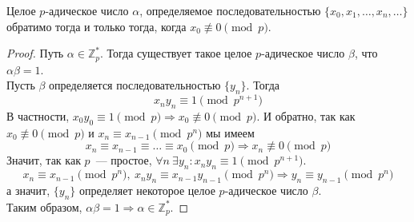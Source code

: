 \documentclass[11pt]{article}
\begin{document}
    \begin{theorem} \label{UnitP-adic}
        Целое $p$-адическое число $\alpha$, определяемое
        последовательностью $\{ x_0, x_1, \ldots, x_n, \ldots \}$ обратимо тогда и только тогда, когда $x_0 \not\equiv 0 \pmod{p}$.
    \end{theorem}
    \begin{proof}
        Путь $\alpha \in \mathbb{Z}_p^{*}$. Тогда существует такое целое $p$-адическое число $\beta$, что $\alpha \beta = 1$. \\
        Пусть $\beta$ определяется последовательностью $\{ y_n \}$. Тогда
        \[ x_n y_n \equiv 1 \pmod{p^{n + 1}} \]
        В частности, $x_0 y_0 \equiv 1 \pmod{p} \Rightarrow x_0 \not\equiv 0 \pmod{p}$. И обратно, так как $x_0 \not\equiv 0 \pmod{p}$ и $x_n \equiv x_{n - 1} \pmod{p^n}$ мы имеем
        \[ x_n \equiv x_{n - 1} \equiv \ldots \equiv x_0 \pmod{p} \Rightarrow x_n \not\equiv 0 \pmod{p} \]
        Значит, так как $p$~--- простое, $\forall n \ \exists y_n \colon x_n y_n \equiv 1 \pmod{p^{n + 1}}$.
        \[ x_n \equiv x_{n - 1} \pmod{p^n}, \ x_n y_n \equiv x_{n - 1} y_{n - 1} \pmod{p^n} \Rightarrow y_n \equiv y_{n - 1} \pmod{p^n} \]
        а значит, $\{ y_n \}$ определяет некоторое целое $p$-адическое число $\beta$.\\
        Таким образом, $\alpha \beta = 1 \Rightarrow \alpha \in \mathbb{Z}_p^{*}$.
    \end{proof}
\end{document}
